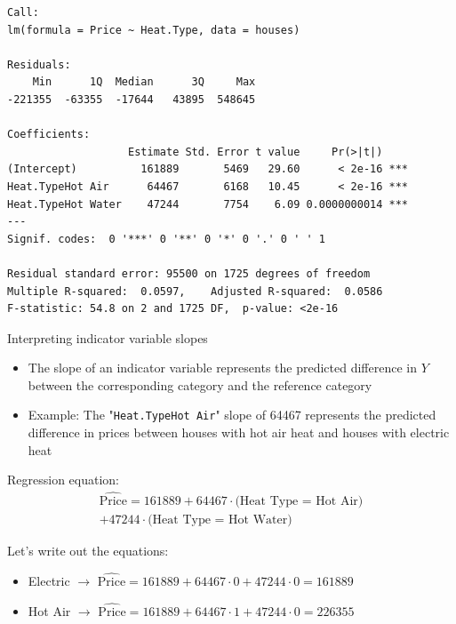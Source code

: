 \documentclass{beamer}\usepackage[]{graphicx}\usepackage[]{color}
\makeatletter
\newenvironment{kframe}{%
 \def\at@end@of@kframe{}%
 \ifinner\ifhmode%
  \def\at@end@of@kframe{\end{minipage}}%
  \begin{minipage}{\columnwidth}%
 \fi\fi%
 \def\FrameCommand##1{\hskip\@totalleftmargin \hskip-\fboxsep
 \colorbox{shadecolor}{##1}\hskip-\fboxsep
     \hskip-\linewidth \hskip-\@totalleftmargin \hskip\columnwidth}%
 \MakeFramed {\advance\hsize-\width
   \@totalleftmargin\z@ \linewidth\hsize
   \@setminipage}}%
 {\par\unskip\endMakeFramed%
 \at@end@of@kframe}
\newenvironment{knitrout}{}{} %
\makeatother
\begin{document}
\begin{darkframes}
\begin{frame}[fragile]
\begin{knitrout}
\begin{kframe}
\begin{verbatim}
Call:
lm(formula = Price ~ Heat.Type, data = houses)

Residuals:
    Min      1Q  Median      3Q     Max 
-221355  -63355  -17644   43895  548645 

Coefficients:
                   Estimate Std. Error t value     Pr(>|t|)    
(Intercept)          161889       5469   29.60      < 2e-16 ***
Heat.TypeHot Air      64467       6168   10.45      < 2e-16 ***
Heat.TypeHot Water    47244       7754    6.09 0.0000000014 ***
---
Signif. codes:  0 '***' 0 '**' 0 '*' 0 '.' 0 ' ' 1

Residual standard error: 95500 on 1725 degrees of freedom
Multiple R-squared:  0.0597,	Adjusted R-squared:  0.0586 
F-statistic: 54.8 on 2 and 1725 DF,  p-value: <2e-16
\end{verbatim}
\end{kframe}
\end{knitrout}
    \end{frame}

    \begin{frame}{Interpreting indicator variable slopes}
      \begin{itemize}
        \item The slope of an indicator variable represents the predicted difference in $Y$ between the corresponding category and the reference category
        \item Example: The "\texttt{Heat.TypeHot Air}" slope of 64467 represents the predicted difference in prices between houses with hot air heat and houses with electric heat
      \end{itemize}
    \end{frame}

    \begin{frame}
      Regression equation:
      \begin{align*}
      \widehat{\text{Price}} = 161889
      + 64467 \cdot\text{(Heat Type = Hot Air)}  \\
      + 47244 \cdot\text{(Heat Type = Hot Water)}
      \end{align*}

      \vspace{0.3in}\pause
      Let's write out the equations:
      \begin{itemize}[<+->]
        \item Electric $\longrightarrow$
          $ \widehat{\text{Price}} = 161889
          + 64467 \cdot 0
          + 47244 \cdot 0 = 161889$

        \item Hot Air $\longrightarrow$
        $ \widehat{\text{Price}} = 161889
        + 64467 \cdot 1
        + 47244 \cdot 0 = 226355$


\end{itemize}
\end{frame}
\end{darkframes}
\end{document}
